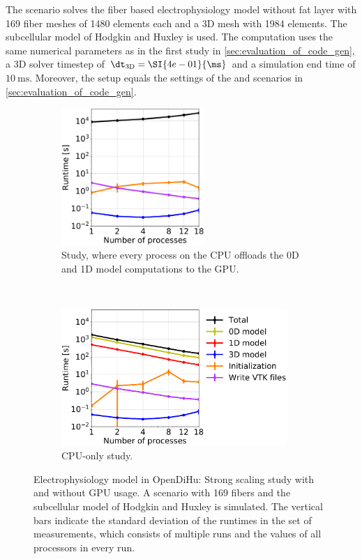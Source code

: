 The scenario solves the fiber based electrophysiology model without fat layer with 169 fiber meshes of 1480 elements each and a 3D mesh with 1984 elements. The subcellular model of Hodgkin and Huxley \cite{Hodgkin1952} is used. The computation uses the same numerical parameters as in the first study in \cref{sec:evaluation_of_code_gen}, a 3D solver timestep of $\dt_\text{3D}=\SI{4e-01}{\ms}$ and a simulation end time of $\SI{10}{\ms}$. Moreover, the setup equals the settings of the  and  scenarios in \cref{sec:evaluation_of_code_gen}.

\begin{figure}%
  \centering%
  \begin{subfigure}[t]{0.45\textwidth}%
    \centering%
    \includegraphics[height=52mm]{images/results/studies/16_hodgkin_huxley_gpu.pdf}%
    \caption{Study, where every process on the CPU offloads the 0D and 1D model computations to the GPU.}%
    \label{fig:16_hodgkin_huxley_gpu}%
  \end{subfigure}
  \,
  \begin{subfigure}[t]{0.53\textwidth}%
    \centering%
    \includegraphics[height=52mm]{images/results/studies/16_hodgkin_huxley_cpu.pdf}%
    \caption{CPU-only study.}%
    \label{fig:16_hodgkin_huxley_cpu}%
  \end{subfigure}   
  \caption{Electrophysiology model in OpenDiHu: Strong scaling study with and without GPU usage. A scenario with 169 fibers and the subcellular model of Hodgkin and Huxley is simulated. The vertical bars indicate the standard deviation of the runtimes in the set of measurements, which consists of multiple runs and the values of all processors in every run.}%
  \label{fig:16_hodgkin_huxley_cpu_gpu}%
\end{figure}%

